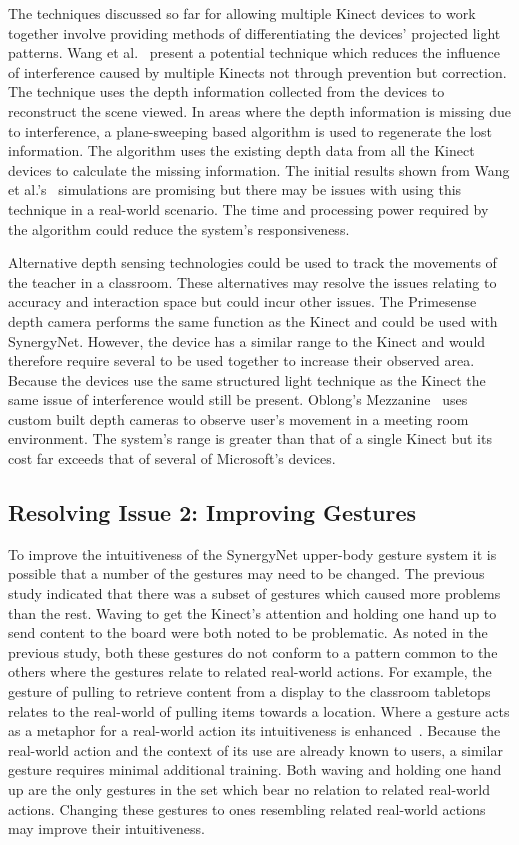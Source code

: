 \documentclass[manuscript, review, screen]{acmart}
\begin{document}
The techniques discussed so far for allowing multiple Kinect devices to work together involve providing methods of differentiating the devices' projected light patterns.
Wang et al.~\cite{Wang2012} present a potential technique which reduces the influence of interference caused by multiple Kinects not through prevention but correction.
The technique uses the depth information collected from the devices to reconstruct the scene viewed.
In areas where the depth information is missing due to interference, a plane-sweeping based algorithm is used to regenerate the lost information.
The algorithm uses the existing depth data from all the Kinect devices to calculate the missing information.
The initial results shown from Wang et al.'s~\cite{Wang2012} simulations are promising but there may be issues with using this technique in a real-world scenario.
The time and processing power required by the algorithm could reduce the system's responsiveness.

Alternative depth sensing technologies could be used to track the movements of the teacher in a classroom.
These alternatives may resolve the issues relating to accuracy and interaction space but could incur other issues.
The Primesense~\cite{Wilson2010} depth camera performs the same function as the Kinect and could be used with SynergyNet.
However, the device has a similar range to the Kinect and would therefore require several to be used together to increase their observed area.
Because the devices use the same structured light technique as the Kinect the same issue of interference would still be present.
Oblong's Mezzanine~\cite{kramer2011} uses custom built depth cameras to observe user's movement in a meeting room environment.
The system's range is greater than that of a single Kinect but its cost far exceeds that of several of Microsoft's devices.

\subsection{Resolving Issue 2: Improving Gestures}
\label{sec:improveIntuitiveness}
To improve the intuitiveness of the SynergyNet upper-body gesture system it is possible that a number of the gestures may need to be changed.
The previous study indicated that there was a subset of gestures which caused more problems than the rest.
Waving to get the Kinect's attention and holding one hand up to send content to the board were both noted to be problematic.
As noted in the previous study, both these gestures do not conform to a pattern common to the others where the gestures relate to related real-world actions.
For example, the gesture of pulling to retrieve content from a display to the classroom tabletops relates to the real-world of pulling items towards a location.
Where a gesture acts as a metaphor for a real-world action its intuitiveness is enhanced~\cite{Wang2008}.
Because the real-world action and the context of its use are already known to users, a similar gesture requires minimal additional training.
Both waving and holding one hand up are the only gestures in the set which bear no relation to related real-world actions.
Changing these gestures to ones resembling related real-world actions may improve their intuitiveness.
\end{document}
